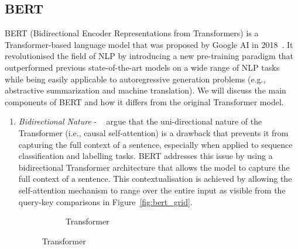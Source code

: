 \subsection{BERT}\label{subsec:bert}
BERT (Bidirectional Encoder Representations from Transformers) is a Transformer-based language model that was proposed by Google AI in 2018~\cite{devlin-etal-2019-bert}.
It revolutionised the field of NLP by introducing a new pre-training paradigm that outperformed previous state-of-the-art models on a wide range of NLP tasks while being easily applicable to autoregressive generation problems (e.g., abstractive summarization and machine translation).
We will discuss the main components of BERT and how it differs from the original Transformer model.
\begin{enumerate}
    \item \emph{Bidirectional Nature} - ~\cite{jurafsky2000} argue that the uni-directional nature of the Transformer (i.e., causal self-attention) is a drawback that
    prevents it from capturing the full context of a sentence, especially when applied to sequence classification and labelling tasks.
    BERT addresses this issue by using a bidirectional Transformer architecture that allows the model to capture the full context of a sentence.
    This contextualisation is achieved by allowing the self-attention mechanism to range over the entire input as visible from the query-key comparisons in Figure~\ref{fig:bert_grid}.
    \begin{figure}[h]
        \centering
        \begin{subfigure}{0.45\textwidth}
            \centering
            \caption{Transformer}
            \label{fig:causal_grid}

\end{subfigure}
\end{figure}
\end{enumerate}
